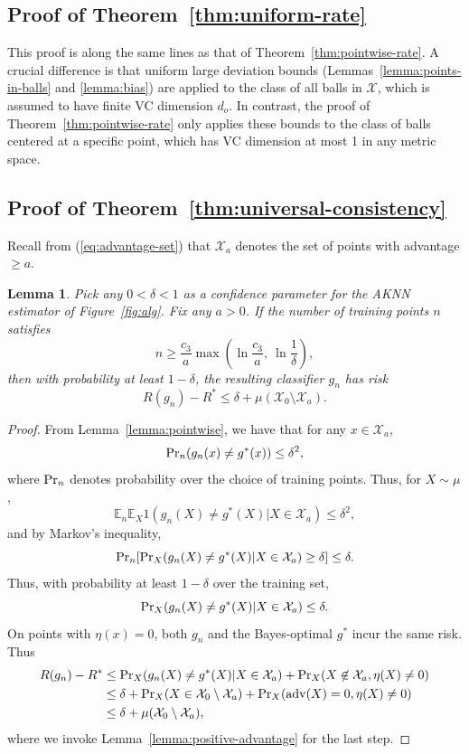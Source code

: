 \documentclass{article}
\def\pr{{\rm Pr}}
\def\E{{\mathbb E}}
\def\X{{\mathcal X}}
\def\adv{{\rm adv}}
\newtheorem{lemma}[theorem]{Lemma}
\begin{document}
\subsection{Proof of Theorem~\ref{thm:uniform-rate}}

This proof is along the same lines as that of Theorem~\ref{thm:pointwise-rate}. A crucial difference is that uniform large deviation bounds (Lemmas~\ref{lemma:points-in-balls} and \ref{lemma:bias}) are applied to the class of all balls in $\X$, which is assumed to have finite VC dimension $d_o$. In contrast, the proof of Theorem~\ref{thm:pointwise-rate} only applies these bounds to the class of balls centered at a specific point, which has VC dimension at most 1 in any metric space.

\subsection{Proof of Theorem~\ref{thm:universal-consistency}}

Recall from (\ref{eq:advantage-set}) that $\X_a$ denotes the set of points with advantage $\geq a$.
\begin{lemma}
Pick any $0 < \delta < 1$ as a confidence parameter for the AKNN estimator of Figure~\ref{fig:alg}. Fix any $a > 0$. If the number of training points $n$ satisfies
$$ n \geq \frac{c_3}{a} \max\left(\ln \frac{c_3}{a}, \ \ln \frac{1}{\delta} \right), $$
then with probability at least $1-\delta$, the resulting classifier $g_n$ has risk
$$ R(g_n) - R^* \leq \delta + \mu(\X_0 \setminus \X_a) .$$
\label{lemma:advantage-set-convergence}
\end{lemma}
\begin{proof}
From Lemma~\ref{lemma:pointwise}, we have that for any $x \in \X_a$, 
$$ \pr_n(g_n(x) \neq g^*(x)) \leq \delta^2 ,$$
where $\pr_n$ denotes probability over the choice of training points. Thus, for $X \sim \mu$,
$$ \E_n \E_X 1(g_n(X) \neq g^*(X) | X \in \X_a) \leq \delta^2 ,$$
and by Markov's inequality,
$$ \pr_n [\pr_X (g_n(X) \neq g^*(X) |  X \in \X_a) \geq \delta] \leq \delta.$$
Thus, with probability at least $1-\delta$ over the training set,
$$\pr_X (g_n(X) \neq g^*(X) |  X \in \X_a) \leq \delta .$$
On points with $\eta(x) = 0$, both $g_n$ and the Bayes-optimal $g^*$ incur the same risk. Thus
\begin{align*}
R(g_n) - R^*
&\leq \pr_X(g_n(X) \neq g^*(X) | X \in \X_a) + \pr_X(X \not\in \X_a, \eta(X) \neq 0) \\ 
&\leq \delta + \pr_X(X \in \X_0 \setminus \X_a) + \pr_X(\adv(X) = 0, \eta(X) \neq 0) \\ 
&\leq \delta + \mu(\X_0 \setminus \X_a),
\end{align*}
where we invoke Lemma~\ref{lemma:positive-advantage} for the last step.
\end{proof}
\end{document}
